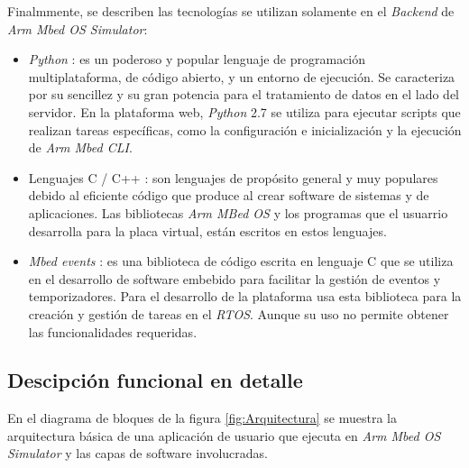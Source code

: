 Finalmmente, se describen las tecnologías se utilizan solamente en el \textit{Backend} de \textit{Arm Mbed OS Simulator}:

\begin{itemize}

    \item \textit{Python} \citep{Python}: es un poderoso y popular lenguaje de programación multiplataforma, de código abierto, y un entorno de ejecución. Se caracteriza por su sencillez y su gran potencia para el tratamiento de datos en el lado del servidor. En la plataforma web, \textit{Python} 2.7 se utiliza para ejecutar scripts que realizan tareas específicas, como la configuración e inicialización y la ejecución de \textit{Arm Mbed CLI}.

    \item Lenguajes C / C++ \citep{LenguajeC}: son lenguajes de propósito general y muy populares debido al eficiente código que produce al crear software de sistemas y de aplicaciones.  Las bibliotecas \textit{Arm MBed OS} y los programas que el usuarrio desarrolla para la placa virtual, están escritos en estos lenguajes.

    \item \textit{Mbed events} \citep{ArmMbedEvents}: es una biblioteca de código escrita en lenguaje C que se utiliza en el desarrollo de software embebido para facilitar la gestión de eventos y temporizadores. Para el desarrollo de la plataforma usa esta biblioteca para la creación y gestión de tareas en el \textit{RTOS}. Aunque su uso no permite obtener las funcionalidades requeridas.
    
\end{itemize}

\subsection{Descipción funcional en detalle}

En el diagrama de bloques de la figura \ref{fig:Arquitectura} se muestra la arquitectura básica de una aplicación de usuario que ejecuta en \textit{Arm Mbed OS Simulator} y las capas de software involucradas.

